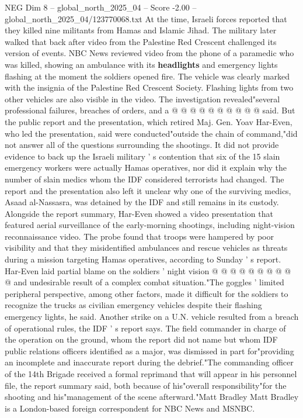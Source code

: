 \begin{textsample}{NEG Dim 8 – global\_north\_2025\_04 – Score -2.00 – global\_north\_2025\_04/123770068.txt}
At the time, Israeli forces reported that they killed nine militants from Hamas and Islamic Jihad.
The military later walked that back after video from the Palestine Red Crescent challenged its version of events.
NBC News reviewed video from the phone of a paramedic who was killed, showing an ambulance with its \textbf{headlights} and emergency lights flashing at the moment the soldiers opened fire.
The vehicle was clearly marked with the insignia of the Palestine Red Crescent Society.
Flashing lights from two other vehicles are also visible in the video.
The investigation revealed"several professional failures, breaches of orders, and a @ @ @ @ @ @ @ @ @ @ said.
But the public report and the presentation, which retired Maj.
Gen.
Yoav Har-Even, who led the presentation, said were conducted"outside the chain of command,"did not answer all of the questions surrounding the shootings.
It did not provide evidence to back up the Israeli military ' s contention that six of the 15 slain emergency workers were actually Hamas operatives, nor did it explain why the number of slain medics whom the IDF considered terrorists had changed.
The report and the presentation also left it unclear why one of the surviving medics, Asaad al-Nassasra, was detained by the IDF and still remains in its custody.
Alongside the report summary, Har-Even showed a video presentation that featured aerial surveillance of the early-morning shootings, including night-vision reconnaissance video.
The probe found that troops were hampered by poor visibility and that they misidentified ambulances and rescue vehicles as threats during a mission targeting Hamas operatives, according to Sunday ' s report.
Har-Even laid partial blame on the soldiers ' night vision @ @ @ @ @ @ @ @ @ @ and undesirable result of a complex combat situation."The goggles ' limited peripheral perspective, among other factors, made it difficult for the soldiers to recognize the trucks as civilian emergency vehicles despite their flashing emergency lights, he said.
Another strike on a U.N. vehicle resulted from a breach of operational rules, the IDF ' s report says.
The field commander in charge of the operation on the ground, whom the report did not name but whom IDF public relations officers identified as a major, was dismissed in part for"providing an incomplete and inaccurate report during the debrief."The commanding officer of the 14th Brigade received a formal reprimand that will appear in his personnel file, the report summary said, both because of his"overall responsibility"for the shooting and his"management of the scene afterward."Matt Bradley Matt Bradley is a London-based foreign correspondent for NBC News and MSNBC.

\end{textsample}
